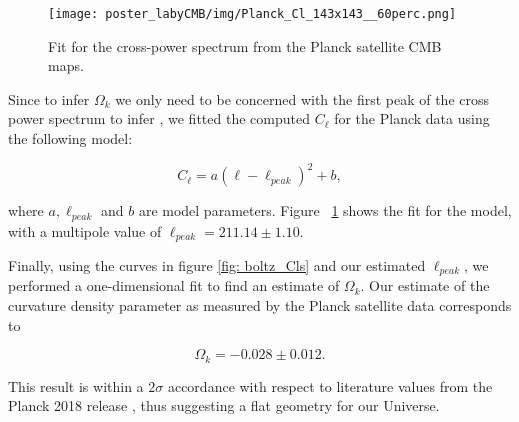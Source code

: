 \begin{figure}
	\begin{minipage}{0.65\textwidth}
		\centering\texttt{[image: poster\_labyCMB/img/Planck\_Cl\_143x143\_\_60perc.png]}
		\caption{Fit for the cross-power spectrum from the Planck satellite CMB maps.}
		\label{fig:planck_cls}
	\end{minipage}
\end{figure}

Since to infer $\Omega_k$ we only need to be concerned with the first peak of the cross power spectrum to infer , we fitted the computed $C_{\ell}$ for the Planck data using the following model:

\begin{equation}
    C_{\ell} = a(\ell-\ell_{peak})^2 + b,
\end{equation}

where $a, \ell_{peak}$ and $b$ are model parameters. Figure ~\ref{fig:planck_cls} shows the fit for the model, with a multipole value of $\ell_{peak} = 211.14 \pm 1.10$.

Finally, using the curves in figure \ref{fig: boltz_Cls} and our estimated $\ell_{peak}$, we performed a one-dimensional fit to find an estimate of $\Omega_k$. Our estimate of the curvature density parameter as measured by the Planck satellite data corresponds to 

\begin{equation*}
    \Omega_k = -0.028 \pm 0.012.
\end{equation*}
\vspace{0.5em}

This result is within a $2\sigma$ accordance with respect to literature values from the Planck 2018 release \cite{planck:2018_main}, thus suggesting a flat geometry for our Universe. 

	
